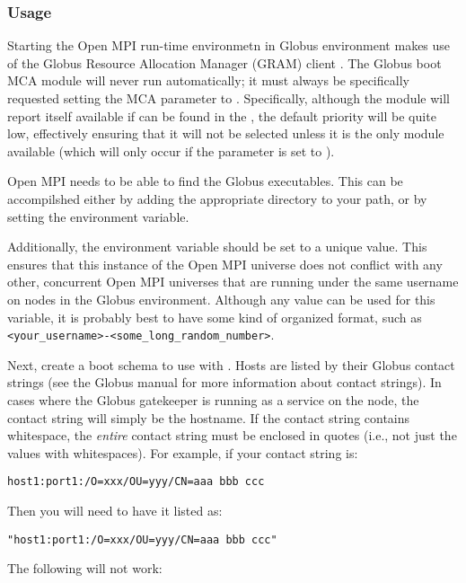 \subsubsection{Usage}

Starting the Open MPI run-time environmetn in Globus environment makes use
of the Globus Resource Allocation Manager (GRAM) client
.
%
The Globus boot MCA module will never run automatically; it must
always be specifically requested setting the  MCA
parameter to .  Specifically, although the
 module will report itself available if
 can be found in the , the default
priority will be quite low, effectively ensuring that it will not be
selected unless it is the only module available (which will only occur
if the  parameter is set to ).

Open MPI needs to be able to find the Globus executables.  This can be
accompilshed either by adding the appropriate directory to your path,
or by setting the  environment variable.

Additionally, the 
environment variable should be set to a unique value.  This ensures
that this instance of the Open MPI universe does not conflict with any
other, concurrent Open MPI universes that are running under the same
username on nodes in the Globus environment.  Although any value can
be used for this variable, it is probably best to have some kind of
organized format, such as {\tt
  <your\_\-username>-<some\_\-long\_\-random\_\-number>}.

Next, create a boot schema to use with .
%
Hosts are listed by their Globus contact strings (see the Globus
manual for more information about contact strings).  In cases where
the Globus gatekeeper is running as a  service on the node,
the contact string will simply be the hostname.  If the contact string
contains whitespace, the {\em entire} contact string must be enclosed
in quotes (i.e., not just the values with whitespaces).
%
For example, if your contact string is:

\centerline{\tt host1:port1:/O=xxx/OU=yyy/CN=aaa bbb ccc}

Then you will need to have it listed as:
    
\centerline{\tt "host1:port1:/O=xxx/OU=yyy/CN=aaa bbb ccc"}

The following will not work:
  
